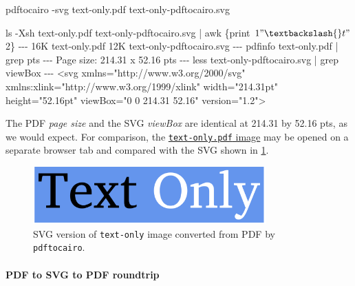 \documentclass[
  12pt,
  british,
  a4paper,
  rgb,
  dvipsnames,
  svgnames,
  hyphens]{article}
\newenvironment{Shaded}{\begin{snugshade}}{\end{snugshade}}
\newcommand{\AttributeTok}[1]{\textcolor[rgb]{0.80,0.80,0.80}{#1}}
\newcommand{\ExtensionTok}[1]{\textcolor[rgb]{0.80,0.80,0.80}{#1}}
\newcommand{\FunctionTok}[1]{\textcolor[rgb]{0.94,0.94,0.56}{#1}}
\newcommand{\KeywordTok}[1]{\textcolor[rgb]{0.94,0.87,0.69}{#1}}
\newcommand{\NormalTok}[1]{\textcolor[rgb]{0.80,0.80,0.80}{#1}}
\newcommand{\OperatorTok}[1]{\textcolor[rgb]{0.94,0.94,0.82}{#1}}
\newcommand{\StringTok}[1]{\textcolor[rgb]{0.80,0.58,0.58}{#1}}
\newcommand{\VariableTok}[1]{\textcolor[rgb]{0.80,0.80,0.80}{#1}}
\begin{document}
\begin{Shaded}
\begin{Highlighting}[]
\ExtensionTok{pdftocairo} \AttributeTok{{-}svg}\NormalTok{ text{-}only.pdf text{-}only{-}pdftocairo.svg}

\FunctionTok{ls} \AttributeTok{{-}Xsh}\NormalTok{ text{-}only.pdf text{-}only{-}pdftocairo.svg }\KeywordTok{|} \FunctionTok{awk} \StringTok{\textquotesingle{}\{print $1 "\textbackslash{}t" $2\}\textquotesingle{}}
\ExtensionTok{{-}{-}{-}}
\ExtensionTok{16K}\NormalTok{     text{-}only.pdf}
\ExtensionTok{12K}\NormalTok{     text{-}only{-}pdftocairo.svg}
\ExtensionTok{{-}{-}{-}}
\ExtensionTok{pdfinfo}\NormalTok{ text{-}only.pdf }\KeywordTok{|} \FunctionTok{grep}\NormalTok{ pts}
\ExtensionTok{{-}{-}{-}}
\ExtensionTok{Page}\NormalTok{ size:      214.31 x 52.16 pts}
\ExtensionTok{{-}{-}{-}}
\FunctionTok{less}\NormalTok{ text{-}only{-}pdftocairo.svg }\KeywordTok{|} \FunctionTok{grep}\NormalTok{ viewBox}
\ExtensionTok{{-}{-}{-}}
\OperatorTok{\textless{}}\NormalTok{svg }\VariableTok{xmlns}\OperatorTok{=}\StringTok{"http://www.w3.org/2000/svg"} \ExtensionTok{xmlns:xlink=}\StringTok{"http://www.w3.org/1999/xlink"}\NormalTok{ width=}\StringTok{"214.31pt"}\NormalTok{ height=}\StringTok{"52.16pt"}\NormalTok{ viewBox=}\StringTok{"0 0 214.31 52.16"}\NormalTok{ version=}\StringTok{"1.2"}\OperatorTok{\textgreater{}}
\end{Highlighting}
\end{Shaded}

The PDF \emph{page size} and the SVG \emph{viewBox} are identical at
214.31 by 52.16 pts, as we would expect. For comparison, the
\href{images/text-only.pdf}{\texttt{text-only.pdf} image} may be opened
on a separate browser tab and compared with the SVG shown in
\cref{fig:SVGfromPDFviapdftocairo}.

\begin{figure}
\hypertarget{fig:SVGfromPDFviapdftocairo}{%
\centering
\includegraphics[width=0.8\textwidth,height=\textheight]{images/text-only-pdftocairo.svg}
\caption{SVG version of \texttt{text-only} image converted from PDF by
\texttt{pdftocairo}.}\label{fig:SVGfromPDFviapdftocairo}
}
\end{figure}

\hypertarget{pdf-to-svg-to-pdf-roundtrip}{%
\paragraph{PDF to SVG to PDF
roundtrip}\label{pdf-to-svg-to-pdf-roundtrip}}
\end{document}
